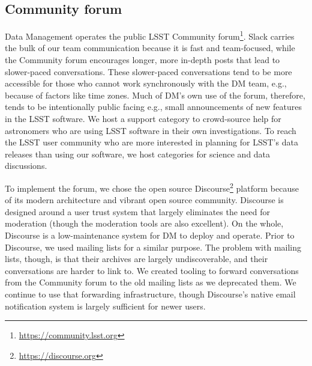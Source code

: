 \subsection{Community forum}
\label{sec:forum}

Data Management operates the public LSST Community forum\footnote{\url{https://community.lsst.org}}.
Slack carries the bulk of our team communication because it is fast and team-focused, while
the Community forum  encourages longer, more in-depth posts that lead to slower-paced conversations.
These slower-paced conversations tend to be more accessible for those who cannot work synchronously with the DM team, e.g., because of factors like time zones.
Much of DM's own use of the forum, therefore, tends to be intentionally public facing e.g., small announcements of new features in the LSST software.
We host a support category to crowd-source help for astronomers who are using LSST software in their own investigations.
To reach the LSST user community who are more interested in planning for LSST's data releases than using our software, we host categories for science and data discussions.

To implement the forum, we chose the open source Discourse\footnote{\url{https://discourse.org}} platform because of its modern architecture and vibrant open source community.
Discourse is designed around a user trust system that largely eliminates the need for moderation (though the moderation tools are also excellent).
On the whole, Discourse is a low-maintenance system for DM to deploy and operate.
Prior to Discourse, we used mailing lists for a similar purpose.
The problem with mailing lists, though, is that their archives are largely undiscoverable, and their conversations are harder to link to.
We created tooling to forward conversations from the Community forum to the old mailing lists as we deprecated them.
We continue to use that forwarding infrastructure, though Discourse's native email notification system is largely sufficient for newer users.
